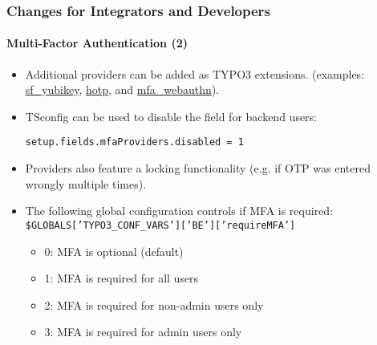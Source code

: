 %

\begin{frame}[fragile]
	\frametitle{Changes for Integrators and Developers}
	\framesubtitle{Multi-Factor Authentication (2)}


	\begin{itemize}

		\item Additional providers can be added as TYPO3 extensions.\newline
			\smaller
				(examples:
				\href{https://github.com/derhansen/sf_yubikey}{sf\_yubikey},
				\href{https://github.com/o-ba/hotp}{hotp}, and
				\href{https://github.com/bnf/mfa_webauthn}{mfa\_webauthn}).
			\normalsize
		\item TSconfig can be used to disable the field for backend users:
\begin{lstlisting}
setup.fields.mfaProviders.disabled = 1
\end{lstlisting}

	\item Providers also feature a locking functionality
		(e.g. if OTP was entered wrongly multiple times).

		\item The following global configuration controls if MFA is required:\newline
			\smaller\texttt{\$GLOBALS['TYPO3\_CONF\_VARS']['BE']['requireMFA']}\normalsize

			\begin{itemize}
				\item 0: MFA is optional (default)
				\item 1: MFA is required for all users
				\item 2: MFA is required for non-admin users only
				\item 3: MFA is required for admin users only
			\end{itemize}

	\end{itemize}

\end{frame}

